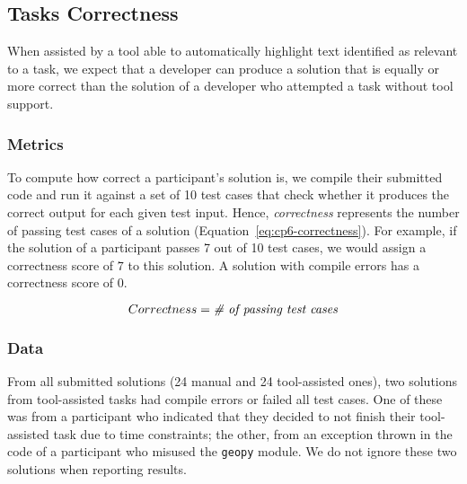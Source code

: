 
\subsection{Tasks Correctness}
\label{cp6:correctness}



When assisted by a tool able to automatically highlight text identified as relevant to a task, we expect that a developer can produce a solution 
that is equally or more correct than the solution of a developer who attempted a task without tool support. 


\subsubsection{Metrics}

To compute how correct a participant's solution is, 
we compile their submitted code and run it against a set of 10 test cases that check whether it produces the correct output for each given test input. 
Hence, \textit{correctness} represents the number of passing test cases of a solution (Equation~\ref{eq:cp6-correctness}).
For example, if the solution of a participant passes 7 out of 10 test cases, we would assign a 
correctness score of $7$ to this solution. 
A solution with compile errors has a correctness score of $0$.


\begin{small}
\begin{equation}
    Correctness = \text{\textit{\# of passing test cases}}
    \label{eq:cp6-correctness}
\end{equation}
\end{small}



% 
\subsubsection{Data}

From all submitted solutions (24 manual and 24 tool-assisted ones), two 
solutions from tool-assisted tasks had compile errors or failed all test cases. 
One of these
was from a participant who indicated that they decided to not finish their tool-assisted task due to time constraints; 
the other, from an exception thrown in the code of a participant who misused the \texttt{geopy} module. We do not ignore these two solutions when reporting results.




